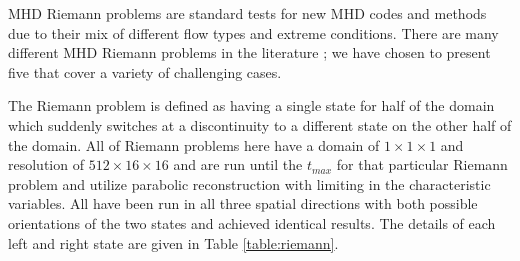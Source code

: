 \documentclass[modern, linenumbers]{aastex631}
\begin{document}
MHD Riemann problems are standard tests for new MHD codes and methods due to their mix of different flow types and extreme conditions. There are many different MHD Riemann problems in the literature \citep{brio_wu_1988, einfeldt_1991, ryu_jones_1995, dai_woodward_1998}; we have chosen to present five that cover a variety of challenging cases.

The Riemann problem is defined as having a single state for half of the domain which suddenly switches at a discontinuity to a different state on the other half of the domain. All of Riemann problems here have a domain of $1\times1\times1$ and resolution of $512\times16\times16$ and are run until the $t_{max}$ for that particular Riemann problem and utilize parabolic reconstruction with limiting in the characteristic variables. All have been run in all three spatial directions with both possible orientations of the two states and achieved identical results. The details of each left and right state are given in Table \ref{table:riemann}.

\end{document}
